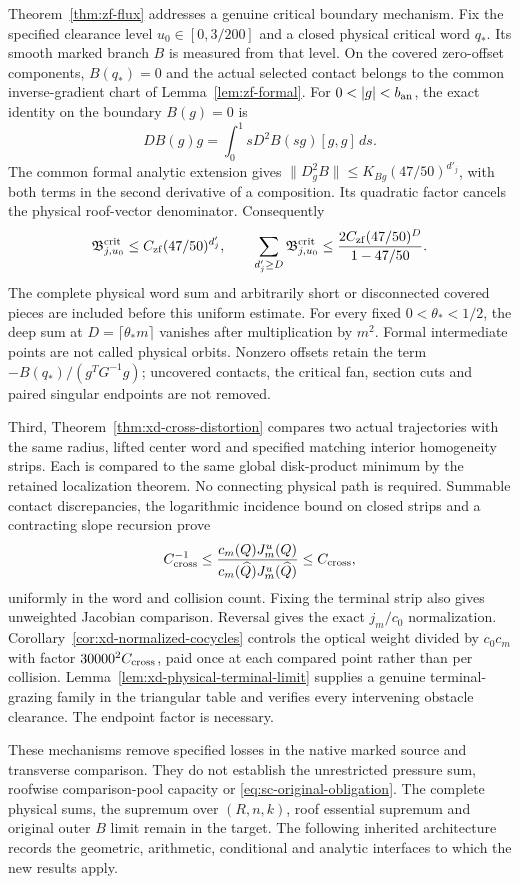 Theorem~\ref{thm:zf-flux} addresses a genuine critical boundary
mechanism. Fix the specified clearance level $u_0\in[0,3/200]$ and a
closed physical critical word $q_*$. Its smooth marked branch $B$
is measured from that level. On the covered zero-offset components,
$B(q_*)=0$ and the actual selected contact belongs to the common
inverse-gradient chart of Lemma~\ref{lem:zf-formal}.
For $0<|g|<b_{\rm an}$, the exact identity on the boundary $B(g)=0$ is
\[
 DB(g)g=\int_0^1sD^2B(sg)[g,g]\,ds .
\]
The common formal analytic extension gives
$\|D_g^2B\|\le K_{Bg}(47/50)^{d'_j}$, with both terms in the
second derivative of a composition. Its quadratic factor cancels
the physical roof-vector denominator. Consequently
\[
 \mathfrak B^{\rm crit}_{j,u_0}\le C_{\rm zf}(47/50)^{d'_j},
 \qquad
 \sum_{d'_j\ge D}\mathfrak B^{\rm crit}_{j,u_0}
       \le {2C_{\rm zf}(47/50)^D\over1-47/50}.
\]
The complete physical word sum and arbitrarily short or disconnected
covered pieces are included before this uniform estimate.
For every fixed $0<\theta_*<1/2$, the deep sum at
$D=\lceil\theta_*m\rceil$ vanishes after multiplication by $m^2$.
Formal intermediate points are not called physical orbits.
Nonzero offsets retain the term $-B(q_*)/(g^TG^{-1}g)$;
uncovered contacts, the critical fan, section cuts and paired
singular endpoints are not removed.

Third, Theorem~\ref{thm:xd-cross-distortion} compares two actual
trajectories with the same radius, lifted center word and specified
matching interior homogeneity strips. Each is compared to the same
global disk-product minimum by the retained localization theorem.
No connecting physical path is required. Summable contact
discrepancies, the logarithmic incidence bound on closed strips and
a contracting slope recursion prove
\[
 C_{\rm cross}^{-1}\le
 {c_m(Q)J_m^u(Q)\over c_m(\widehat Q)J_m^u(\widehat Q)}
       \le C_{\rm cross},
\]
uniformly in the word and collision count. Fixing the terminal strip
also gives unweighted Jacobian comparison. Reversal gives the exact
$j_m/c_0$ normalization. Corollary~\ref{cor:xd-normalized-cocycles}
controls the optical weight divided by $c_0c_m$ with factor
$30000^2C_{\rm cross}$, paid once at each compared point rather than
per collision. Lemma~\ref{lem:xd-physical-terminal-limit} supplies a
genuine terminal-grazing family in the triangular table and verifies
every intervening obstacle clearance. The endpoint factor is necessary.

These mechanisms remove specified losses in the native marked source
and transverse comparison. They do not establish the unrestricted
pressure sum, roofwise comparison-pool capacity or
\eqref{eq:sc-original-obligation}. The complete physical sums,
the supremum over $(R,n,k)$, roof essential supremum and original
outer $B$ limit remain in the target. The following inherited
architecture records the geometric, arithmetic, conditional and
analytic interfaces to which the new results apply.
